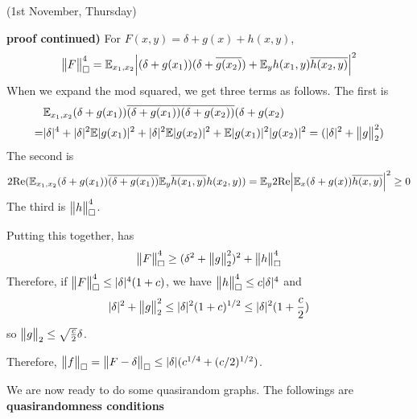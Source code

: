 \documentclass[12pt,a4paper]{report}
\newenvironment{proof}
{\begin{changemargin}{1cm}{0.5cm}
	}%
	{\end{changemargin}
}
\begin{document}
\newday

(1st November, Thursday)
\s

\begin{proof}
\textbf{proof continued)} For $F(x,y) = \delta + g(x) + h(x,y)$,
\begin{align*}
\bigl\lVert F\bigr\rVert_{\tiny{\square}}^4 =  \mathbb{E}_{x_1,x_2} \Big| (\delta + g(x_1))(\delta + \overline{g(x_2)}) + \mathbb{E}_y h(x_1,y) \overline{h(x_2,y)} \Big|^2
\end{align*}
When we expand the mod squared, we get three terms as follows. The first is
\begin{align*}
& \mathbb{E}_{x_1, x_2} (\delta + g(x_1)) \overline{(\delta + g(x_1))} \overline{(\delta + g(x_2))} (\delta + g(x_2) \\
=& |\delta|^4 + |\delta|^2 \mathbb{E} |g(x_1)|^2 + |\delta|^2 \mathbb{E} |g(x_2)|^2 + \mathbb{E} |g(x_1)|^2 |g(x_2)|^2 = (|\delta|^2 + \bigl\lVert g\bigr\rVert_{2}^2)
\end{align*}
The second is
\begin{align*}
2 \text{Re}(\mathbb{E}_{x_1,x_2} (\delta + g(x_1)) \overline{(\delta + g(x_1))} \mathbb{E}_y \overline{h(x_1,y)} h(x_2,y)) = \mathbb{E}_y 2\text{Re} \Big| \mathbb{E}_x (\delta + g(x)) \overline{h(x,y)} \Big|^2 \geq 0
\end{align*}
The third is $\bigl\lVert h\bigr\rVert_{\tiny{\square}}^4$.

\quad Putting this together, has
\begin{align*}
\bigl\lVert F\bigr\rVert_{\tiny{\square}}^4 \geq (\delta^2 + \bigl\lVert g\bigr\rVert_{2}^2)^2 + \bigl\lVert h\bigr\rVert_{\tiny{\square}}^4
\end{align*}
Therefore, if $\bigl\lVert F\bigr\rVert_{\tiny{\square}}^4 \leq |\delta|^4 (1+c)$, we have $\bigl\lVert h\bigr\rVert_{\tiny{\square}}^4 \leq c|\delta|^4$ and
\begin{align*}
|\delta|^2 + \bigl\lVert g\bigr\rVert_{2}^2 \leq |\delta|^2 (1+c)^{1/2} \leq |\delta|^2 (1+ \frac{c}{2})
\end{align*}
so $\bigl\lVert g\bigr\rVert_{2} \leq \sqrt{\frac{c}{2}}\delta$.

\quad Therefore, $\bigl\lVert f\bigr\rVert_{\tiny{\square}} = \bigl\lVert F-\delta\bigr\rVert_{\tiny{\square}} \leq |\delta| (c^{1/4} + (c/2)^{1/2})$.

\eop
\end{proof}
\s

We are now ready to do some quasirandom graphs. The followings are \textbf{quasirandomness conditions}
\s
\end{document}

